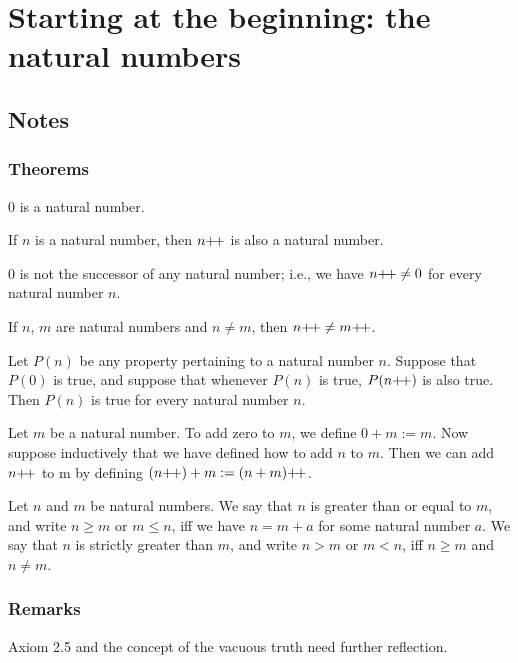 \section{Starting at the beginning: the natural numbers}
\subsection{Notes}
\subsubsection{Theorems}
\begin{axiom}
    $0$ is a natural number.
\end{axiom}
\begin{axiom}
    If $n$ is a natural number, then $n{+}{\mkern-3mu}{+}$ is also a natural number.
\end{axiom}
\begin{axiom}
    $0$ is not the successor of any natural number; i.e., we have $n{+}{\mkern-3mu}{+} \neq 0$ for every natural number $n$.
\end{axiom}
\begin{axiom}
    If $n$, $m$ are natural numbers and $n \neq m$, then $n{+}{\mkern-3mu}{+} \neq m{+}{\mkern-3mu}{+}$.
\end{axiom}
\begin{axiom}
    Let $P(n)$ be any property pertaining to a natural number $n$. Suppose that $P(0)$ is true, and suppose that whenever $P(n)$ is true, $P(n{+}{\mkern-3mu}{+})$ is also true. Then $P(n)$ is true for every natural number $n$.
\end{axiom}
\begin{definition}
    Let $m$ be a natural number. To add zero to $m$, we define $0 + m := m$. Now suppose inductively that we have defined how to add $n$ to $m$. Then we can add $n{+}{\mkern-3mu}{+}$ to m by defining $(n{+}{\mkern-3mu}{+}) + m := (n + m){+}{\mkern-3mu}{+}$.
\end{definition}
\begin{definition}
    Let $n$ and $m$ be natural numbers. We say that $n$ is greater than or equal to $m$, and write $n \geq m$ or $m \leq n$, iff we have $n = m + a$ for some natural number $a$. We say that $n$ is strictly greater than $m$, and write $n > m$ or $m < n$, iff $n \geq m$ and $n \neq m$.
\end{definition}
\subsubsection{Remarks}
Axiom 2.5 and the concept of the vacuous truth need further reflection.


